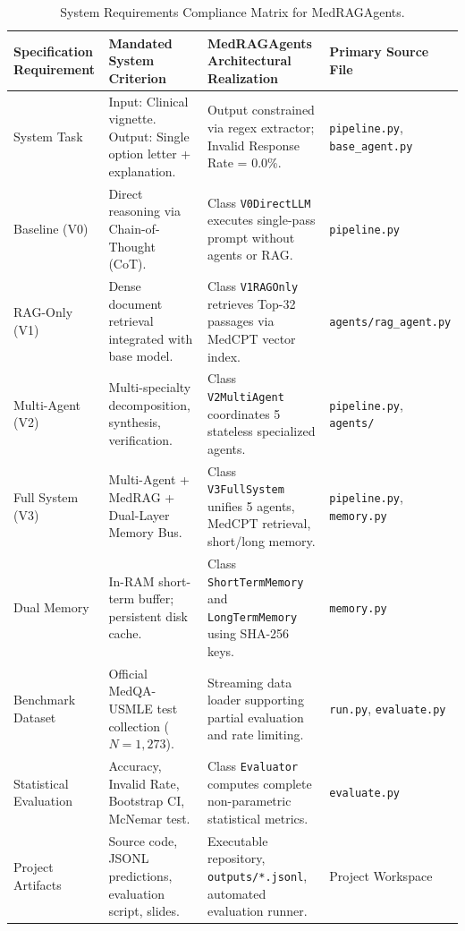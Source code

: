 \begin{table}[h!]
\centering
\caption{System Requirements Compliance Matrix for MedRAGAgents.}
\label{tab:compliance_matrix}
\small
\begin{tabularx}{\textwidth}{l X X l}
\toprule
\textbf{Specification Requirement} & \textbf{Mandated System Criterion} & \textbf{MedRAGAgents Architectural Realization} & \textbf{Primary Source File} \\
\midrule
System Task & Input: Clinical vignette. Output: Single option letter + explanation. & Output constrained via regex extractor; Invalid Response Rate = $0.0\%$. & \texttt{pipeline.py}, \texttt{base\_agent.py} \\
Baseline (V0) & Direct reasoning via Chain-of-Thought (CoT). & Class \texttt{V0DirectLLM} executes single-pass prompt without agents or RAG. & \texttt{pipeline.py} \\
RAG-Only (V1) & Dense document retrieval integrated with base model. & Class \texttt{V1RAGOnly} retrieves Top-32 passages via MedCPT vector index. & \texttt{agents/rag\_agent.py} \\
Multi-Agent (V2) & Multi-specialty decomposition, synthesis, verification. & Class \texttt{V2MultiAgent} coordinates 5 stateless specialized agents. & \texttt{pipeline.py}, \texttt{agents/} \\
Full System (V3) & Multi-Agent + MedRAG + Dual-Layer Memory Bus. & Class \texttt{V3FullSystem} unifies 5 agents, MedCPT retrieval, short/long memory. & \texttt{pipeline.py}, \texttt{memory.py} \\
Dual Memory & In-RAM short-term buffer; persistent disk cache. & Class \texttt{ShortTermMemory} and \texttt{LongTermMemory} using SHA-256 keys. & \texttt{memory.py} \\
Benchmark Dataset & Official MedQA-USMLE test collection ($N=1,273$). & Streaming data loader supporting partial evaluation and rate limiting. & \texttt{run.py}, \texttt{evaluate.py} \\
Statistical Evaluation & Accuracy, Invalid Rate, Bootstrap CI, McNemar test. & Class \texttt{Evaluator} computes complete non-parametric statistical metrics. & \texttt{evaluate.py} \\
Project Artifacts & Source code, JSONL predictions, evaluation script, slides. & Executable repository, \texttt{outputs/*.jsonl}, automated evaluation runner. & Project Workspace \\
\bottomrule
\end{tabularx}
\end{table}

